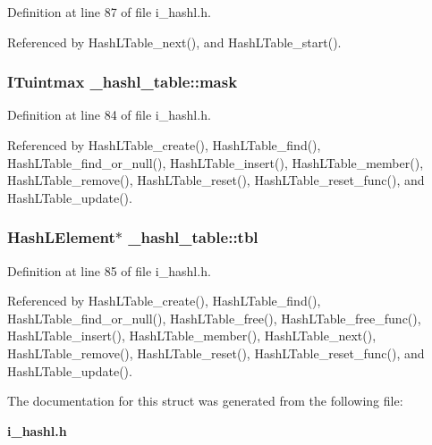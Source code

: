 Definition at line 87 of file i\_\-hashl.h.

Referenced by Hash\-LTable\_\-next(), and Hash\-LTable\_\-start().
\subsubsection{\setlength{\rightskip}{0pt plus 5cm}\bf{ITuintmax} \bf{\_\-hashl\_\-table::mask}}\label{struct__hashl__table_64f705dd53c896eecd918c1d27634745}




Definition at line 84 of file i\_\-hashl.h.

Referenced by Hash\-LTable\_\-create(), Hash\-LTable\_\-find(), Hash\-LTable\_\-find\_\-or\_\-null(), Hash\-LTable\_\-insert(), Hash\-LTable\_\-member(), Hash\-LTable\_\-remove(), Hash\-LTable\_\-reset(), Hash\-LTable\_\-reset\_\-func(), and Hash\-LTable\_\-update().
\subsubsection{\setlength{\rightskip}{0pt plus 5cm}\bf{Hash\-LElement}$\ast$ \bf{\_\-hashl\_\-table::tbl}}\label{struct__hashl__table_09917b6dcbc8979f50b54286b6cf19ac}




Definition at line 85 of file i\_\-hashl.h.

Referenced by Hash\-LTable\_\-create(), Hash\-LTable\_\-find(), Hash\-LTable\_\-find\_\-or\_\-null(), Hash\-LTable\_\-free(), Hash\-LTable\_\-free\_\-func(), Hash\-LTable\_\-insert(), Hash\-LTable\_\-member(), Hash\-LTable\_\-next(), Hash\-LTable\_\-remove(), Hash\-LTable\_\-reset(), Hash\-LTable\_\-reset\_\-func(), and Hash\-LTable\_\-update().

The documentation for this struct was generated from the following file:\begin{CompactItemize}
\item 
\bf{i\_\-hashl.h}\end{CompactItemize}
